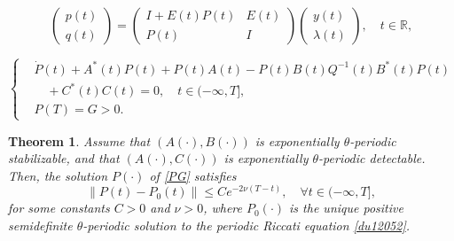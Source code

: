 \documentclass[10pt,a4paper]{amsart}
\newtheorem{theorem}{Theorem}
\begin{document}
		\begin{equation}
			\begin{pmatrix}
				p(t)\\ q (t)
			\end{pmatrix}=
			\begin{pmatrix}
				I+E(t)P(t)&E(t)\\P(t)&I
			\end{pmatrix}
			\begin{pmatrix}
				y(t)\\  \lambda (t)
			\end{pmatrix},\quad t\in\mathbb R,
		\end{equation}

	\begin{equation}\label{PG}
		\left\{
		\begin{aligned}
			&\dot{P}(t)+A^*(t)P(t)+P(t)A(t)-P(t)B(t)Q^{-1}(t)B^*(t)P(t)\\
			&\quad +C^*(t)C(t)=0,\quad t\in(-\infty,T],\\
			&P(T)=G>0.
		\end{aligned}
		\right.
	\end{equation}

	\begin{theorem}\label{thm:analy_riccati}
		Assume that $(A(\cdot),B(\cdot))$ is exponentially $\theta$-periodic stabilizable, and that $(A(\cdot),C(\cdot))$ is exponentially $\theta$-periodic detectable. Then, the solution $P(\cdot)$ of \eqref{PG} satisfies 
		\begin{equation}\label{eq:riccati_esti}
			\|P(t)-P_0(t)\|\leq C e^{-2\nu(T-t)}, \quad \forall t \in (-\infty, T],
		\end{equation}
		for some constants $C>0$ and $\nu>0$, where $P_0(\cdot)$ is the unique positive semidefinite $\theta$-periodic solution to the periodic Riccati equation \eqref{du12052}.
	\end{theorem}
\end{document}
